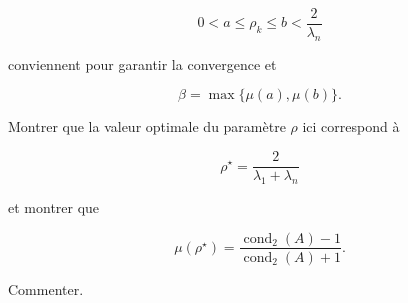 \documentclass[11pt, a4paper]{article}
\begin{document}
\[
0<a\leq \rho_k \leq b < \frac{2}{\lambda_n}
\]

conviennent pour garantir la convergence et

\[
\beta = \max\{\mu(a),\mu(b)\}. 
\]

Montrer que la valeur optimale du paramètre $\rho$
ici correspond à 

\[
\rho^\star = \frac{2}{\lambda_1+\lambda_n}
\]

et montrer que

\[
\mu(\rho^\star) = \frac{\mathop{cond}_2(A)-1}{\mathop{cond}_2(A)+1}.
\]

Commenter.
%
\end{document}
